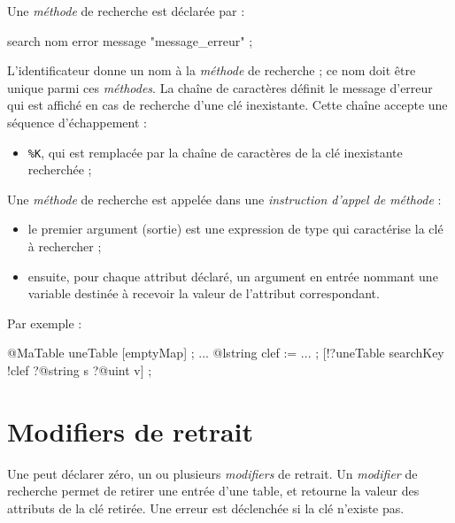 Une \emph{méthode} de recherche est déclarée par :

\begin{galgascode}
search nom error message "message_erreur" ;
\end{galgascode}

L'identificateur  donne un nom à la \emph{méthode} de recherche ; ce nom doit être unique parmi ces \emph{méthodes}. La chaîne de caractères  définit le message d'erreur qui est affiché en cas de recherche d'une clé inexistante. Cette chaîne accepte une séquence d'échappement :
\begin{itemize}
  \item \colorbox{\couleurCodeGALGAS}{\texttt{\%K}}, qui est remplacée par la chaîne de caractères de la clé inexistante recherchée ;
\end{itemize}


Une \emph{méthode} de recherche est appelée dans une \emph{instruction d'appel de méthode} :
\begin{itemize}
  \item le premier argument (sortie) est une expression de type  qui caractérise la clé à rechercher ;
  \item ensuite, pour chaque attribut déclaré, un argument en entrée nommant une variable destinée à recevoir la valeur de l'attribut correspondant.
\end{itemize}

Par exemple :
\begin{galgascode}
@MaTable uneTable [emptyMap] ;
...
@lstring clef := ... ;
[!?uneTable searchKey !clef ?@string s ?@uint v] ;
\end{galgascode}













\section{Modifiers de retrait}

Une  peut déclarer zéro, un ou plusieurs \emph{modifiers} de retrait. Un \emph{modifier} de recherche permet de retirer une entrée d'une table, et retourne la valeur des attributs de la clé retirée. Une erreur est déclenchée si la clé n'existe pas.


